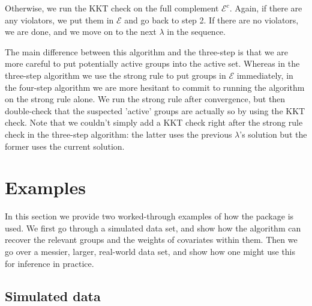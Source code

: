 \documentclass[12pt]{article}
\begin{document}
Otherwise, we run the KKT check on the full complement $\mathcal{E}^c$. Again, if there are any violators, we put them in $\mathcal{E}$ and go back to step 2. If there are no violators, we are done, and we move on to the next $\lambda$ in the sequence.

The main difference between this algorithm and the three-step is that we are more careful to put potentially active groups into the active set. Whereas in the three-step algorithm we use the strong rule to put groups in $\mathcal{E}$ immediately, in the four-step algorithm we are more hesitant to commit to running the algorithm on the strong rule alone. We run the strong rule after convergence, but then double-check that the suspected 'active' groups are actually so by using the KKT check. Note that we couldn't simply add a KKT check right after the strong rule check in the three-step algorithm: the latter uses the previous $\lambda$'s solution but the former uses the current solution.



\section{Examples}

In this section we provide two worked-through examples of how the package is used. We first go through a simulated data set, and show how the algorithm can recover the relevant groups and the weights of covariates within them. Then we go over a messier, larger, real-world data set, and show how one might use this for inference in practice. 

\subsection{Simulated data}
\end{document}

